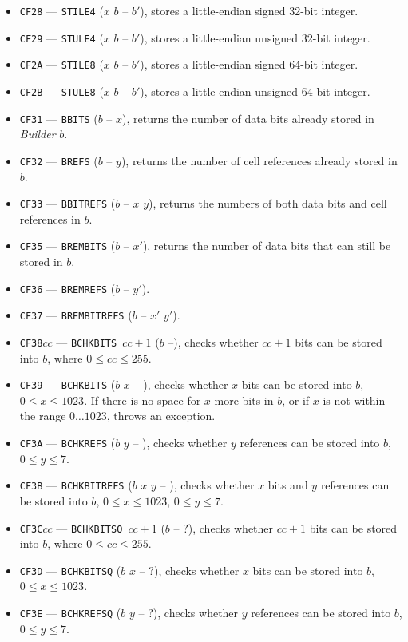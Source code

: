 \documentclass[12pt,oneside]{article}
\begin{document}
\begin{itemize}
\item {\tt CF28} --- {\tt STILE4} ($x$ $b$ -- $b'$), stores a little-endian signed 32-bit integer.
\item {\tt CF29} --- {\tt STULE4} ($x$ $b$ -- $b'$), stores a little-endian unsigned 32-bit integer.
\item {\tt CF2A} --- {\tt STILE8} ($x$ $b$ -- $b'$), stores a little-endian signed 64-bit integer.
\item {\tt CF2B} --- {\tt STULE8} ($x$ $b$ -- $b'$), stores a little-endian unsigned 64-bit integer.
\item {\tt CF31} --- {\tt BBITS} ($b$ -- $x$), returns the number of data bits already stored in {\em Builder\/} $b$.
\item {\tt CF32} --- {\tt BREFS} ($b$ -- $y$), returns the number of cell references already stored in $b$.
\item {\tt CF33} --- {\tt BBITREFS} ($b$ -- $x$ $y$), returns the numbers of both data bits and cell references in $b$.
\item {\tt CF35} --- {\tt BREMBITS} ($b$ -- $x'$), returns the number of data bits that can still be stored in $b$.
\item {\tt CF36} --- {\tt BREMREFS} ($b$ -- $y'$).
\item {\tt CF37} --- {\tt BREMBITREFS} ($b$ -- $x'$ $y'$).
\item {\tt CF38$cc$} --- {\tt BCHKBITS $cc+1$} ($b$ --), checks whether $cc+1$ bits can be stored into $b$, where $0\leq cc\leq 255$.
\item {\tt CF39} --- {\tt BCHKBITS} ($b$ $x$ -- ), checks whether $x$ bits can be stored into $b$, $0\leq x\leq 1023$. If there is no space for $x$ more bits in $b$, or if $x$ is not within the range $0\ldots1023$, throws an exception.
\item {\tt CF3A} --- {\tt BCHKREFS} ($b$ $y$ -- ), checks whether $y$ references can be stored into $b$, $0\leq y\leq 7$.
\item {\tt CF3B} --- {\tt BCHKBITREFS} ($b$ $x$ $y$ -- ), checks whether $x$ bits and $y$ references can be stored into $b$, $0\leq x\leq 1023$, $0\leq y\leq 7$.
\item {\tt CF3C$cc$} --- {\tt BCHKBITSQ $cc+1$} ($b$ -- $?$), checks whether $cc+1$ bits can be stored into $b$, where $0\leq cc\leq 255$.
\item {\tt CF3D} --- {\tt BCHKBITSQ} ($b$ $x$ -- $?$), checks whether $x$ bits can be stored into $b$, $0\leq x\leq 1023$.
\item {\tt CF3E} --- {\tt BCHKREFSQ} ($b$ $y$ -- $?$), checks whether $y$ references can be stored into $b$, $0\leq y\leq 7$.

\end{itemize}
\end{document}
